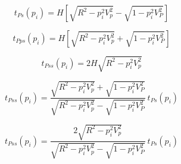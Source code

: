 \documentclass {letter}
\begin{document}
\begin{letter}


\begin{equation}
t_{Ps}(p_i)=H \left[ \sqrt{R^2 - p_i^2V_p^2} - \sqrt{1 - p_i^2V_P^2} \right]
\end{equation}

\begin{equation}
t_{Pps}(p_i)=H \left[ \sqrt{R^2 - p_i^2V_p^2} + \sqrt{1 - p_i^2V_P^2} \right]
\end{equation}

\begin{equation}
t_{Pss}(p_i)= 2H  \sqrt{R^2 - p_i^2V_p^2} 
\end{equation}

\begin{equation}
t_{Pss}(p_i) = 
 \frac{ \sqrt{R^2 - p_i^2V_p^2} + \sqrt{1 - p_i^2V_P^2} } 
      { \sqrt{R^2 - p_i^2V_p^2} - \sqrt{1 - p_i^2V_P^2} } \: t_{Ps}(p_i)
\end{equation}

\begin{equation}
t_{Pss}(p_i) =
 \frac{ 2 \sqrt{R^2 - p_i^2V_p^2} } 
      {\sqrt{R^2 - p_i^2V_p^2} - \sqrt{1 - p_i^2V_P^2}} \: t_{Ps}(p_i)
\end{equation}




\end{letter}
\end{document}
